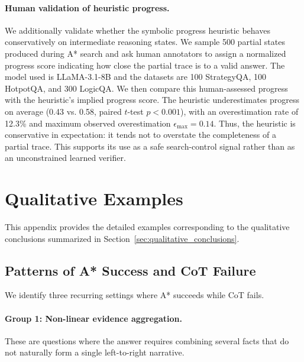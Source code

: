 \documentclass[10pt]{article}
\begin{document}
\paragraph{Human validation of heuristic progress.}
We additionally validate whether the symbolic progress heuristic behaves
conservatively on intermediate reasoning states. We sample 500 partial
states produced during A* search and ask human annotators to assign a
normalized progress score indicating how close the partial trace is to a
valid answer. The model used is LLaMA-3.1-8B and the datasets are 100 StrategyQA, 100 HotpotQA, and 300 LogicQA. We then compare this human-assessed progress with the
heuristic's implied progress score. The heuristic underestimates progress
on average (0.43 vs. 0.58, paired \(t\)-test \(p<0.001\)), with an
overestimation rate of 12.3\% and maximum observed overestimation
\(\epsilon_{\max}=0.14\). Thus, the heuristic is conservative in
expectation: it tends not to overstate the completeness of a partial
trace. This supports its use as a safe search-control signal rather than
as an unconstrained learned verifier.


















\section{Qualitative Examples}
\label{app:qualitative_examples}

This appendix provides the detailed examples corresponding to the qualitative conclusions summarized in Section~\ref{sec:qualitative_conclusions}.

\subsection{Patterns of A* Success and CoT Failure}
\label{app:astar_success}

We identify three recurring settings where A* succeeds while CoT fails.

\paragraph{Group 1: Non-linear evidence aggregation.}
These are questions where the answer requires combining several facts that do not naturally form a single left-to-right narrative.
\end{document}
